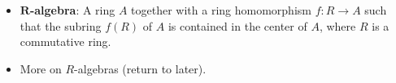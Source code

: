 \documentclass[../notes.tex]{subfiles}
\begin{document}
\begin{itemize}
    \begin{proposition}\label{prp:10.1}
        Let $R$ be a ring and let $M$ be an $R$-module. A subset $N$ of $M$ is a submodule if and only if
        \begin{enumerate}
            \item $N\neq\emptyset$;
            \item $x+ry\in N$ for all $r\in R$, $x,y\in N$.
        \end{enumerate}
        \begin{proof}
            Given.
        \end{proof}
    \end{proposition}
    \item \textbf{$\bm{R}$-algebra}: A ring $A$ together with a ring homomorphism $f:R\to A$ such that the subring $f(R)$ of $A$ is contained in the center of $A$, where $R$ is a commutative ring.
    \item More on $R$-algebras (return to later).
\end{itemize}
\end{document}
